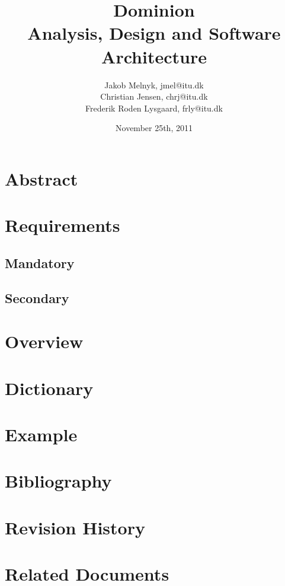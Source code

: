 \documentclass[11pt,a4paper,titlepage]{article}
\title{\huge{Dominion}\\
\large{Analysis, Design and Software Architecture}
}
\author{
Jakob Melnyk, jmel@itu.dk\\
Christian Jensen, chrj@itu.dk\\
Frederik Roden Lysgaard, frly@itu.dk
}
\date{November 25th, 2011}
\begin{document}
\tableofcontents
\pagebreak
\section{Abstract}

\section{Requirements}
\subsection{Mandatory}
\subsection{Secondary}
\section{Overview}
\section{Dictionary}
\section{Example}
\section{Bibliography}
\section{Revision History}
\section{Related Documents}
\end{document}
